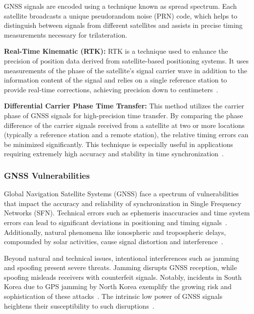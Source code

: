 \documentclass[12pt, a4paper]{extarticle}
\begin{document}
GNSS signals are encoded using a technique known as spread spectrum. Each
satellite broadcasts a unique pseudorandom noise (PRN) code, which helps to
distinguish between signals from different satellites and assists in precise
timing measurements necessary for trilateration.

\textbf{Real-Time Kinematic (RTK):} RTK is a technique used to enhance the
precision of position data derived from satellite-based positioning systems. It
uses measurements of the phase of the satellite's signal carrier wave in
addition to the information content of the signal and relies on a single
reference station to provide real-time corrections, achieving precision down to
centimeters~\cite{high-precision-rtk, patent}.

\textbf{Differential Carrier Phase Time Transfer:} This method utilizes the
carrier phase of GNSS signals for high-precision time transfer. By comparing
the phase difference of the carrier signals received from a satellite at two or
more locations (typically a reference station and a remote station), the
relative timing errors can be minimized significantly. This technique is
especially useful in applications requiring extremely high accuracy and
stability in time synchronization~\cite{carrier-phase-measurement}.

\subsubsection{GNSS Vulnerabilities}\label{gnss-vuln}

Global Navigation Satellite Systems (GNSS) face a spectrum of vulnerabilities
that impact the accuracy and reliability of synchronization in Single Frequency
Networks (SFN). Technical errors such as ephemeris inaccuracies and time system
errors can lead to significant deviations in positioning and timing
signals~\cite{dempster2001vulnerable}. Additionally, natural phenomena like
ionospheric and tropospheric delays, compounded by solar activities, cause
signal distortion and interference~\cite{infrastructure2001vulnerability}.

Beyond natural and technical issues, intentional interferences such as jamming
and spoofing present severe threats. Jamming disrupts GNSS reception, while
spoofing misleads receivers with counterfeit signals. Notably, incidents in
South Korea due to GPS jamming by North Korea exemplify the growing risk and
sophistication of these attacks~\cite{SeoKim2013}. The intrinsic low power of
GNSS signals heightens their susceptibility to such disruptions~\cite{time-sync-attacks}.
\end{document}
